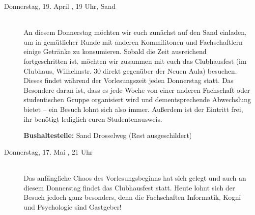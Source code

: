 \begin{description}

\item[Donnerstag, 19. April \Jahr, 19 Uhr, Sand]\ \\
An diesem Donnerstag möchten wir euch zunächst auf den Sand einladen, um in gemütlicher Runde mit anderen Kommilitonen und Fachschaftlern einige Getränke zu konsumieren. Sobald die Zeit ausreichend fortgeschritten ist, möchten wir zusammen mit euch das Clubhausfest (im Clubhaus, Wilhelmstr. 30 direkt gegenüber der Neuen Aula) besuchen. Dieses findet während der Vorlesungszeit jeden Donnerstag statt. Das Besondere daran ist, dass es jede Woche von einer anderen Fachschaft oder studentischen Gruppe organisiert wird und dementsprechende Abwechslung bietet -- ein Besuch lohnt sich also immer. Außerdem ist der Eintritt frei, ihr benötigt lediglich euren Studentenausweis.

\textbf{Bushaltestelle:} Sand Drosselweg (Rest ausgeschildert)


\item[Donnerstag, 17. Mai \Jahr, 21 Uhr]\ \\
Das anfängliche Chaos des Vorlesungsbeginns hat sich gelegt und auch an diesem Donnerstag findet das Clubhausfest statt. Heute lohnt sich der Besuch jedoch ganz besonders, denn die Fachschaften Informatik, Kogni und Psychologie sind Gastgeber!\\ 
 
 
\end{description}
